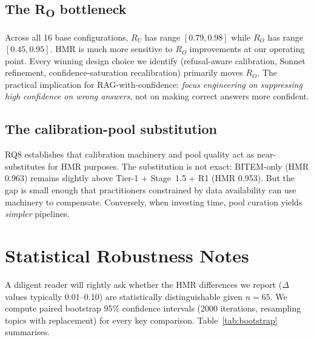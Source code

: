 \documentclass[11pt,a4paper]{article}
\newcommand{\HMR}{\textsc{HMR}}
\begin{document}
\subsection{The R\textsubscript{O} bottleneck}\label{sec:ro_bottleneck}

Across all 16 base configurations, $R_U$ has range $[0.79, 0.98]$
while $R_O$ has range $[0.45, 0.95]$. \HMR{} is much more sensitive
to $R_O$ improvements at our operating point. Every winning design
choice we identify (refusal-aware calibration, Sonnet refinement,
confidence-saturation recalibration) primarily moves $R_O$. The practical
implication for RAG-with-confidence: \emph{focus engineering on
suppressing high confidence on wrong answers}, not on making correct
answers more confident.

\subsection{The calibration-pool substitution}

RQ8 establishes that calibration machinery and pool quality act as
near-substitutes for \HMR{} purposes. The substitution is not exact:
BITEM-only (\HMR{} 0.963) remains slightly above Tier-1 + Stage~1.5
+ R1 (\HMR{} 0.953). But the gap is small enough that practitioners
constrained by data availability can use machinery to compensate.
Conversely, when investing time, pool curation yields
\emph{simpler} pipelines.

\section{Statistical Robustness Notes}\label{sec:robustness}

A diligent reader will rightly ask whether the \HMR{} differences we
report ($\Delta$ values typically 0.01--0.10) are statistically
distinguishable given $n = 65$. We compute paired bootstrap 95\%
confidence intervals (2000 iterations, resampling topics with
replacement) for every key comparison. Table~\ref{tab:bootstrap}
summarises.
\end{document}
